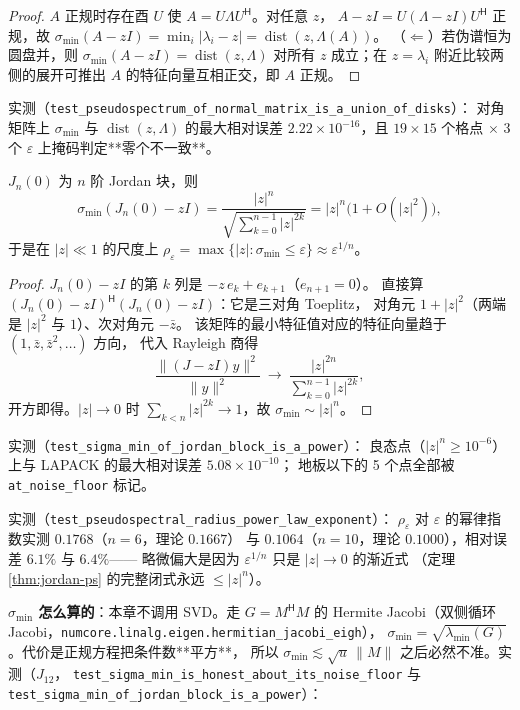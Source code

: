 \begin{proof}
$A$ 正规时存在酉 $U$ 使 $A=U\Lambda U^{\mathsf H}$。对任意 $z$，
$A-zI=U(\Lambda-zI)U^{\mathsf H}$ 正规，故 $\sigma_{\min}(A-zI)
=\min_i|\lambda_i-z|=\operatorname{dist}(z,\Lambda(A))$。
（$\Leftarrow$）若伪谱恒为圆盘并，则 $\sigma_{\min}(A-zI)=\operatorname{dist}(z,\Lambda)$
对所有 $z$ 成立；在 $z=\lambda_i$ 附近比较两侧的展开可推出
$A$ 的特征向量互相正交，即 $A$ 正规。
\end{proof}

实测（\texttt{test\_pseudospectrum\_of\_normal\_matrix\_is\_a\_union\_of\_disks}）：
对角矩阵上 $\sigma_{\min}$ 与 $\operatorname{dist}(z,\Lambda)$ 的最大相对误差
$2.22\times10^{-16}$，且 $19\times15$ 个格点 $\times$ 3 个 $\varepsilon$
上掩码判定**零个不一致**。

\begin{theorem}
\label{thm:jordan-ps}
$J_n(0)$ 为 $n$ 阶 Jordan 块，则
\[
  \sigma_{\min}(J_n(0)-zI)=\frac{|z|^n}{\sqrt{\sum_{k=0}^{n-1}|z|^{2k}}}
  =|z|^n\big(1+O(|z|^2)\big),
\]
于是在 $|z|\ll1$ 的尺度上 $\rho_\varepsilon=\max\{|z|:\sigma_{\min}\le\varepsilon\}
\approx\varepsilon^{1/n}$。
\end{theorem}

\begin{proof}
$J_n(0)-zI$ 的第 $k$ 列是 $-z\,e_k+e_{k+1}$（$e_{n+1}=0$）。
直接算 $(J_n(0)-zI)^{\mathsf H}(J_n(0)-zI)$：它是三对角 Toeplitz，
对角元 $1+|z|^2$（两端是 $|z|^2$ 与 $1$）、次对角元 $-\bar z$。
该矩阵的最小特征值对应的特征向量趋于 $(1,\bar z,\bar z^2,\dots)$ 方向，
代入 Rayleigh 商得
\[
  \frac{\|(J-zI)y\|^2}{\|y\|^2}\ \longrightarrow\
  \frac{|z|^{2n}}{\sum_{k=0}^{n-1}|z|^{2k}},
\]
开方即得。$|z|\to0$ 时 $\sum_{k<n}|z|^{2k}\to1$，故 $\sigma_{\min}\sim|z|^n$。
\end{proof}

实测（\texttt{test\_sigma\_min\_of\_jordan\_block\_is\_a\_power}）：
良态点（$|z|^n\ge10^{-6}$）上与 LAPACK 的最大相对误差 $5.08\times10^{-10}$；
地板以下的 5 个点全部被 \texttt{at\_noise\_floor} 标记。

实测（\texttt{test\_pseudospectral\_radius\_power\_law\_exponent}）：
$\rho_\varepsilon$ 对 $\varepsilon$ 的幂律指数实测 $0.1768$（$n=6$，理论 $0.1667$）
与 $0.1064$（$n=10$，理论 $0.1000$），相对误差 $6.1\%$ 与 $6.4\%$——
略微偏大是因为 $\varepsilon^{1/n}$ 只是 $|z|\to0$ 的渐近式
（定理 \ref{thm:jordan-ps} 的完整闭式永远 $\le|z|^n$）。

\textbf{$\sigma_{\min}$ 怎么算的}：本章不调用 SVD。走 $G=M^{\mathsf H}M$ 的
Hermite Jacobi（双侧循环 Jacobi，\texttt{numcore.linalg.eigen.hermitian\_jacobi\_eigh}），
$\sigma_{\min}=\sqrt{\lambda_{\min}(G)}$。代价是正规方程把条件数**平方**，
所以 $\sigma_{\min}\lesssim\sqrt u\,\|M\|$ 之后必然不准。实测（$J_{12}$，
\texttt{test\_sigma\_min\_is\_honest\_about\_its\_noise\_floor} 与
\texttt{test\_sigma\_min\_of\_jordan\_block\_is\_a\_power}）：

